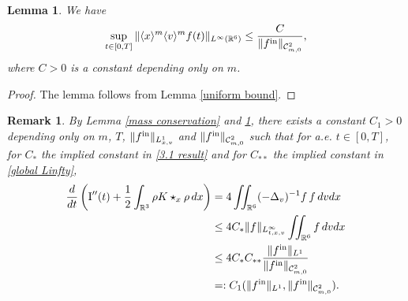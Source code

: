\documentclass[reqno,11pt,final]{amsart}
\theoremstyle{plain}
\newtheorem{lemma}[theorem]{Lemma}
\newtheorem{remark}[theorem]{Remark}
\numberwithin{equation}{section}
\numberwithin{theorem}{section}
\begin{document}
\begin{lemma}\label{Linfty est f}
    We have \begin{align}\label{global Linfty}
       \sup_{t\in[0,T]} \| \langle x\rangle^m\langle v\rangle^mf(t)\|_{L^\infty(\mathbb{R}^6)}\le \frac{C}{\|f^\textup{in}\|_{\mathcal{C}^2_{m,0}}},
    \end{align}where $C>0$ is a constant depending only on $m$.
\end{lemma}

\begin{proof}
    The lemma follows from Lemma \ref{uniform bound}.
\end{proof}


\begin{remark}\label{E' est}By Lemma \ref{mass conservation} and \ref{Linfty est f}, there exists a constant $C_1>0$ depending only on $m$, $T$, $\|f^\textup{in}\|_{L^1_{x,v}}$ and $\|f^\textup{in}\|_{\mathcal{C}^2_{m,0}}$ such that for a.e. $t\in[0,T]$, for $C_*$ the implied constant in \eqref{3.1 result} and for $C_{**}$ the implied constant in \eqref{global Linfty},
\begin{align*}
\frac{d}{dt}\left(\textup{I}''(t) + \frac{1}{2} \int_{\mathbb{R}^3} \rho K\star_x \rho\,dx\right)&=4\iint_{\mathbb{R}^6} (-\Delta_v)^{-1}f\, f\,dvdx\\
&\le 4C_*\lVert f\rVert_{L^\infty_{t,x,v}}\iint_{\mathbb{R}^6} f\,dvdx\\
&\le 4C_*C_{**}\frac{\lVert f^\textup{in}\rVert_{L^1}}{\|f^\textup{in}\|_{\mathcal{C}^2_{m,0}}}\\
&=: C_1(\|f^\textup{in}\|_{L^1}, \|f^\textup{in}\|_{\mathcal{C}^2_{m,0}}).
\end{align*}
\end{remark}
\end{document}
